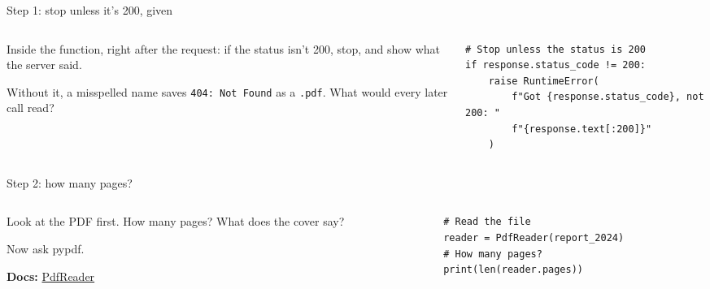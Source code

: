 \documentclass[9pt,aspectratio=169]{beamer}
\begin{document}
\begin{frame}[fragile]{Step 1: stop unless it's 200, given}
    \begin{columns}[T]
        \begin{column}{0.37\textwidth}
            Inside the function, right after the request: if the status isn't 200, stop, and show what the server said.

            \medskip
            Without it, a misspelled name saves \texttt{404: Not Found} as a \texttt{.pdf}. What would every later call read?
        \end{column}
        \begin{column}{0.6\textwidth}
\begin{lstlisting}
# Stop unless the status is 200
if response.status_code != 200:
    raise RuntimeError(
        f"Got {response.status_code}, not 200: "
        f"{response.text[:200]}"
    )
\end{lstlisting}
        \end{column}
    \end{columns}
\end{frame}

\begin{frame}[fragile]{Step 2: how many pages?}
    \begin{columns}[T]
        \begin{column}{0.37\textwidth}
            Look at the PDF first. How many pages? What does the cover say?

            \medskip
            Now ask pypdf.

            \medskip
            {\scriptsize\textbf{Docs:} \href{https://pypdf.readthedocs.io/en/stable/modules/PdfReader.html}{PdfReader}\par}
        \end{column}
        \begin{column}{0.6\textwidth}
\begin{lstlisting}
# Read the file
reader = PdfReader(report_2024)
# How many pages?
print(len(reader.pages))
\end{lstlisting}
        \end{column}
    \end{columns}
\end{frame}
\end{document}
